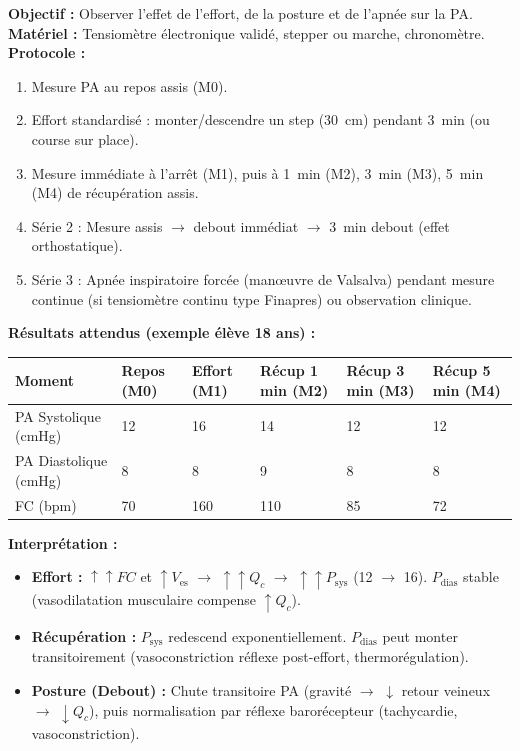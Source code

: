 \documentclass[11pt]{article}
\begin{document}
\begin{experience}
\textbf{Objectif :} Observer l'effet de l'effort, de la posture et de l'apnée sur la PA.
\textbf{Matériel :} Tensiomètre électronique validé, stepper ou marche, chronomètre.
\textbf{Protocole :}
\begin{enumerate}
    \item Mesure PA au repos assis (M0).
    \item Effort standardisé : monter/descendre un step (\SI{30}{cm}) pendant \SI{3}{min} (ou course sur place).
    \item Mesure immédiate à l'arrêt (M1), puis à \SI{1}{min} (M2), \SI{3}{min} (M3), \SI{5}{min} (M4) de récupération assis.
    \item Série 2 : Mesure assis $\rightarrow$ debout immédiat $\rightarrow$ \SI{3}{min} debout (effet orthostatique).
    \item Série 3 : Apnée inspiratoire forcée (manœuvre de Valsalva) pendant mesure continue (si tensiomètre continu type Finapres) ou observation clinique.
\end{enumerate}
\textbf{Résultats attendus (exemple élève 18 ans) :}
\begin{center}
\begin{tabularx}{\linewidth}{|l|X|X|X|X|X|}\hline
\textbf{Moment} & \textbf{Repos (M0)} & \textbf{Effort (M1)} & \textbf{Récup 1 min (M2)} & \textbf{Récup 3 min (M3)} & \textbf{Récup 5 min (M4)} \\ \hline
PA Systolique (\si{cmHg}) & 12 & 16 & 14 & 12 & 12 \\ \hline
PA Diastolique (\si{cmHg}) & 8 & 8 & 9 & 8 & 8 \\ \hline
FC (\si{bpm}) & 70 & 160 & 110 & 85 & 72 \\ \hline
\end{tabularx}
\end{center}
\textbf{Interprétation :}
\begin{itemize}
    \item \textbf{Effort :} $\uparrow \uparrow FC$ et $\uparrow V_{\text{es}}$ $\rightarrow$ $\uparrow \uparrow Q_c$ $\rightarrow$ $\uparrow \uparrow P_{\text{sys}}$ (12 $\rightarrow$ 16). $P_{\text{dias}}$ stable (vasodilatation musculaire compense $\uparrow Q_c$).
    \item \textbf{Récupération :} $P_{\text{sys}}$ redescend exponentiellement. $P_{\text{dias}}$ peut monter transitoirement (vasoconstriction réflexe post-effort, thermorégulation).
    \item \textbf{Posture (Debout) :} Chute transitoire PA (gravité $\rightarrow$ $\downarrow$ retour veineux $\rightarrow$ $\downarrow Q_c$), puis normalisation par réflexe barorécepteur (tachycardie, vasoconstriction).
\end{itemize}
\end{experience}
\end{document}
